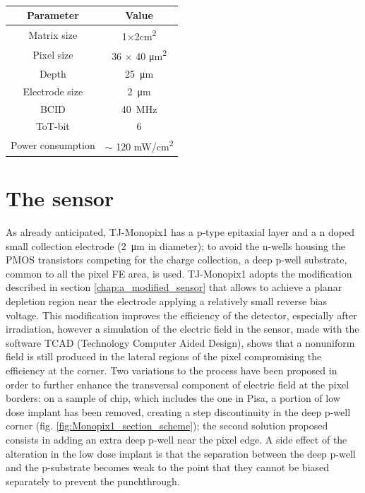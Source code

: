 \begin{table}
    \begin{center}
    \begin{tabular}{| c |c |}
    \hline
    Parameter & Value\\
    \hline
    \hline
    Matrix size &  1$\times$2\si{cm\squared}\\
    Pixel size & 36 $\times$ 40 \si{\um\squared}\\
    Depth & \SI{25}{\um}\\
    Electrode size & \SI{2}{\um}\\
    BCID & \SI{40}{MHz} \\
    ToT-bit & 6 \\
    Power consumption & $\sim$ 120 \si{mW/cm\squared}\\    
    \hline
    \end{tabular}
    \caption{}
    \label{tab:LF-TJ-Monopix}
    \end{center}
\end{table}


\section{The sensor}
    As already anticipated, TJ-Monopix1 has a p-type epitaxial layer and a n doped small collection electrode (\SI{2}{\um} in diameter); to avoid the n-wells housing the PMOS transistors competing for the charge collection, a deep p-well substrate, common to all the pixel FE area, is used.
    TJ-Monopix1 adopts the modification described in section \ref{chap:a_modified_sensor} that allows to achieve a planar depletion region near the electrode applying a relatively small reverse bias voltage.
    This modification improves the efficiency of the detector, especially after irradiation, however a simulation of the electric field in the sensor, made with the software TCAD (Technology Computer Aided Design), shows that a nonuniform field is still produced in the lateral regions of the pixel compromising the efficiency at the corner.
    Two variations to the process have been proposed in order to further enhance the transversal component of electric field at the pixel borders: on a sample of chip, which includes the one in Pisa, a portion of low dose implant has been removed, creating a step discontinuity in the deep p-well corner (fig. \ref{fig:Monopix1_section_scheme}); the second solution proposed\cite{MOUSTAKAS THESYS, PAG 58} consists in adding an extra deep p-well near the pixel edge.
    A side effect of the alteration in the low dose implant is that the separation between the deep p-well and the p-substrate becomes weak to the point that they cannot be biased separately to prevent the punchthrough. 


